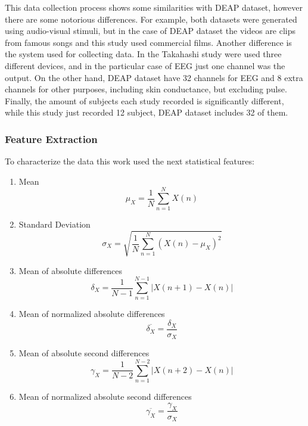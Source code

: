 \documentclass{sig-alternate}
\begin{document}
This data collection process shows some similarities with DEAP dataset, however there are some notorious 
differences. For example, both datasets were generated using audio-visual stimuli, but
in the case of DEAP dataset the videos are clips from famous songs and this study used commercial films.
Another difference is the system used for collecting data. In the Takahashi study were
used three different devices, and in the particular case of EEG just one channel was the
output. On the other hand, DEAP dataset have 32 channels for EEG and 8 extra channels
for other purposes, including skin conductance, but excluding pulse. Finally, the amount of
subjects each study recorded is significantly different, while this study just 
recorded 12 subject, DEAP dataset includes 32 of them.                

\subsubsection{Feature Extraction}

To characterize the data this work used the next statistical features:
\begin{enumerate}
\item Mean 
\begin{equation}
\mu_{X} = \frac{1}{N}\sum^{N}_{n=1} X(n)
\end{equation}
\item Standard Deviation 
\begin{equation}
\sigma_{X} = \sqrt{ \frac{1}{N}\sum^{N}_{n=1} (X(n)-\mu_{X})^{2} }
\end{equation}
\item Mean of absolute differences 
\begin{equation}
\delta_{X} = \frac{1}{N-1} \sum^{N-1}_{n=1}|X(n+1)-X(n)|
\end{equation}
\item Mean of normalized absolute differences
\begin{equation}
\overline{\delta_{X}} = \frac{\delta_{X}}{\sigma_{X}}
\end{equation}
\item Mean of absolute second differences  
\begin{equation}
\gamma_{X} = \frac{1}{N-2} \sum^{N-2}_{n=1}|X(n+2)-X(n)|
\end{equation}
\item Mean of normalized absolute second differences
\begin{equation}
\overline{\gamma_{X}} = \frac{\gamma_{X}}{\sigma_{X}}
\end{equation}
\end{enumerate}  
\end{document}
